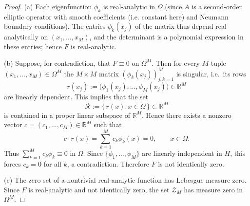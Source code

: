 \documentclass[11pt,a4paper]{article}
\numberwithin{equation}{section}
\theoremstyle{definition}
\newcommand{\1}{\mathbbm{1}}
\begin{document}
\begin{proof}
(a) Each eigenfunction $\phi_k$ is real-analytic in $\Omega$ (since $A$ is
a second-order elliptic operator with smooth coefficients (i.e. constant here) and Neumann boundary
conditions). The entries $\phi_k(x_j)$ of the matrix thus depend
real-analytically on $(x_1,\dots,x_M)$, and the determinant is a polynomial
expression in these entries; hence $F$ is real-analytic.

(b) Suppose, for contradiction, that $F\equiv 0$ on $\Omega^M$. Then for
every $M$-tuple $(x_1,\dots,x_M)\in\Omega^M$ the $M\times M$ matrix
$(\phi_k(x_j))_{j,k=1}^M$ is singular, i.e.\ its rows
\[
r(x_j) := \big(\phi_1(x_j),\dots,\phi_M(x_j)\big)\in\mathbb{R}^M
\]
are linearly dependent. This implies that the set
\[
\mathcal{R} := \{\, r(x) : x\in\Omega \,\} \subset \mathbb{R}^M
\]
is contained in a proper linear subspace of $\mathbb{R}^M$. Hence there
exists a nonzero vector $c=(c_1,\dots,c_M)\in\mathbb{R}^M$ such that
\[
c\cdot r(x) = \sum_{k=1}^M c_k \phi_k(x) = 0,\qquad x\in\Omega.
\]
Thus $\sum_{k=1}^M c_k \phi_k \equiv 0$ in $\Omega$. Since
$\{\phi_1,\dots,\phi_M\}$ are linearly independent in $H$, this forces
$c_k=0$ for all $k$, a contradiction. Therefore $F$ is not identically zero.

(c) The zero set of a nontrivial real-analytic
function has Lebesgue measure zero. Since $F$ is real-analytic and not
identically zero, the set $\mathcal{Z}_M$ has measure zero in $\Omega^M$.
\end{proof}
\end{document}
